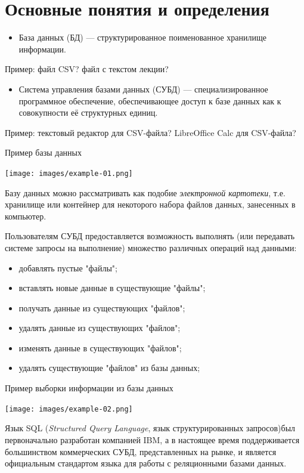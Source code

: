 \documentclass{beamer}
\begin{document}
\section{Основные понятия и определения}
\begin{frame}
\begin{itemize}
\item База данных (БД) — структурированное поименованное хранилище информации.
\end{itemize}
Пример: файл CSV? файл с текстом лекции?
\begin{itemize}
\item Система управления базами данных (СУБД) — специализированное программное обеспечение, обеспечивающее доступ к базе данных как к совокупности её структурных единиц.
\end{itemize}
Пример: текстовый редактор для CSV-файла? LibreOffice Calc для CSV-файла?
\end{frame} 

\begin{frame}
\begin{block}{Пример базы данных}
\begin{center}
\texttt{[image: images/example-01.png]}
\end{center}
\end{block}
\end{frame} 

\begin{frame}
Базу данных можно рассматривать как подобие \textit{электронной картотеки}, т.е. хранилище или контейнер для некоторого набора файлов данных, занесенных в компьютер.

Пользователям СУБД предоставляется возможность выполнять (или передавать системе запросы на выполнение) множество различных операций над данными:
\begin{itemize}
\item добавлять пустые "файлы";
\item вставлять новые данные в существующие "файлы";
\item получать данные из существующих "файлов";
\item удалять данные из существующих "файлов";
\item изменять данные в существующих "файлов";
\item удалять существующие "файлов" из базы данных;
\end{itemize}
\end{frame}

\begin{frame}
\begin{block}{Пример выборки информации из базы данных}
\begin{center}
\texttt{[image: images/example-02.png]}
\end{center}
\end{block}
Язык SQL (\textit{Structured Query Language}, язык структурированных запросов)был первоначально разработан компанией IBM, а в настоящее время поддерживается большинством коммерческих СУБД, представленных на рынке, и является официальным стандартом языка для работы с реляционными базами данных.
\end{frame} 
\end{document}
